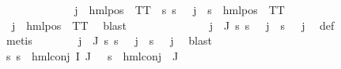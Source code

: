 \begin{isabellebody}
\ \ \ \ \ \ \ \ \isamarkupfalse%
\ \isamarkupfalse%
\ {\isachardoublequoteopen}{\isasymexists}{\isasymalpha}{\isachardot}{\kern0pt}\ {\isasymPsi}\ j\ {\isacharequal}{\kern0pt}\ hml{\isacharunderscore}{\kern0pt}pos\ {\isasymalpha}\ TT\ {\isasymand}\ {\isacharparenleft}{\kern0pt}{\isasymforall}s{\isachardot}{\kern0pt}\ {\isacharparenleft}{\kern0pt}s\ {\isasymTurnstile}\ {\isasymPhi}\ j{\isacharparenright}{\kern0pt}\ {\isacharequal}{\kern0pt}\ {\isacharparenleft}{\kern0pt}s\ {\isasymTurnstile}\ hml{\isacharunderscore}{\kern0pt}pos\ {\isasymalpha}\ TT{\isacharparenright}{\kern0pt}{\isacharparenright}{\kern0pt}{\isachardoublequoteclose}\isanewline
\ \ \ \ \ \ \ \ \ \ \isamarkupfalse%
\ {\isacartoucheopen}{\isasymPsi}\ j\ {\isacharequal}{\kern0pt}\ hml{\isacharunderscore}{\kern0pt}pos\ {\isasymalpha}\ TT{\isacartoucheclose}\ \isamarkupfalse%
\ blast\isanewline
\ \ \ \ \ \ \isamarkupfalse%
\isanewline
\ \ \ \ \ \ \isamarkupfalse%
\ {\isachardoublequoteopen}{\isasymforall}j\ {\isasymin}\ J{\isachardot}{\kern0pt}\ {\isasymforall}s{\isachardot}{\kern0pt}\ s\ {\isasymTurnstile}\ {\isacharparenleft}{\kern0pt}{\isasymPsi}\ j{\isacharparenright}{\kern0pt}\ {\isasymlongleftrightarrow}\ s\ {\isasymTurnstile}\ {\isacharparenleft}{\kern0pt}{\isasymPhi}\ j{\isacharparenright}{\kern0pt}{\isachardoublequoteclose}\ \isamarkupfalse%
\ {\isasymPsi}{\isacharunderscore}{\kern0pt}def\ \isanewline
\ \ \ \ \ \ \ \ \isamarkupfalse%
\ metis\isanewline
\ \ \ \ \ \ \isamarkupfalse%
\ {\isachardoublequoteopen}{\isasymforall}j\ {\isasymin}\ J{\isachardot}{\kern0pt}\ {\isasymforall}s{\isachardot}{\kern0pt}\ {\isasymnot}s\ {\isasymTurnstile}\ {\isacharparenleft}{\kern0pt}{\isasymPsi}\ j{\isacharparenright}{\kern0pt}\ {\isasymlongleftrightarrow}\ {\isasymnot}s\ {\isasymTurnstile}\ {\isacharparenleft}{\kern0pt}{\isasymPhi}\ j{\isacharparenright}{\kern0pt}{\isachardoublequoteclose}\ \isamarkupfalse%
\ blast\isanewline
\ \ \ \ \ \ \isamarkupfalse%
\ {\isachardoublequoteopen}{\isacharparenleft}{\kern0pt}{\isasymforall}s{\isachardot}{\kern0pt}\ {\isacharparenleft}{\kern0pt}s\ {\isasymTurnstile}\ hml{\isacharunderscore}{\kern0pt}conj\ I\ J\ {\isasymPhi}{\isacharparenright}{\kern0pt}\ {\isacharequal}{\kern0pt}\ {\isacharparenleft}{\kern0pt}s\ {\isasymTurnstile}\ hml{\isacharunderscore}{\kern0pt}conj\ {\isacharbraceleft}{\kern0pt}{\isacharbraceright}{\kern0pt}\ J\ {\isasymPsi}{\isacharparenright}{\kern0pt}{\isacharparenright}{\kern0pt}{\isachardoublequoteclose}\isanewline

\end{isabellebody}
